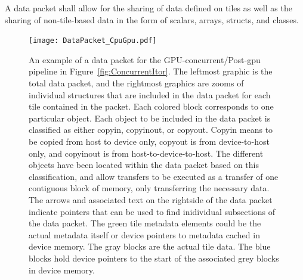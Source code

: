 \documentclass{article}
\begin{document}
\begin{spec}
A data packet shall allow for the sharing of data defined on tiles as well as the
sharing of non-tile-based data in the form of scalars, arrays, structs, and classes.

\end{spec}


\begin{figure}[!hp]
\begin{center}
\texttt{[image: DataPacket\_CpuGpu.pdf]}
\caption[]{An example of a data packet  for the
GPU-concurrent/Post-gpu pipeline in Figure~\ref{fig:ConcurrentItor}.  The
leftmost graphic is the total data packet, and the rightmost graphics are zooms
of individual structures that are included in the data packet for each tile
contained in the packet.  Each
colored block corresponds to one particular object.  Each object to be included
 in the data packet is classified as either copyin,
copyinout, or copyout. Copyin means to be copied from host to device only,
copyout is from device-to-host only, and copyinout is from host-to-device-to-host.
The different objects have been located within the data packet based on this
classification, and allow transfers to be executed as a transfer of one
contiguous block of memory, only transferring the necessary data.  The arrows
and associated text
on the rightside of the data packet indicate pointers that can be used to find
inidividual subsections of the data packet.  The green tile metadata elements
could be the actual metadata itself or device pointers to metadata cached in
device memory.  The gray blocks are the actual tile data. The blue blocks
hold device pointers to the start of the associated grey blocks in device
memory.}
\label{fig:DataPacket_CpuGpu}
\end{center}
\end{figure}
\end{document}
